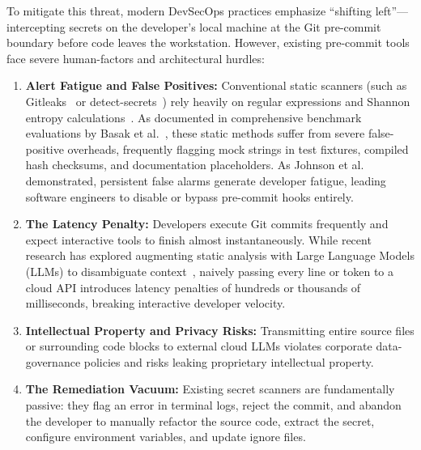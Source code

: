 To mitigate this threat, modern DevSecOps practices emphasize ``shifting left''---intercepting secrets on the developer's local machine at the Git pre-commit boundary before code leaves the workstation. However, existing pre-commit tools face severe human-factors and architectural hurdles:
\begin{enumerate}
    \item \textbf{Alert Fatigue and False Positives:} Conventional static scanners (such as Gitleaks~\cite{rice2018gitleaks} or detect-secrets~\cite{yelp2019detectsecrets}) rely heavily on regular expressions and Shannon entropy calculations~\cite{shannon1948mathematical}. As documented in comprehensive benchmark evaluations by Basak et al.~\cite{basak2023comparative}, these static methods suffer from severe false-positive overheads, frequently flagging mock strings in test fixtures, compiled hash checksums, and documentation placeholders. As Johnson et al.~\cite{johnson2013why} demonstrated, persistent false alarms generate developer fatigue, leading software engineers to disable or bypass pre-commit hooks entirely.
    \item \textbf{The Latency Penalty:} Developers execute Git commits frequently and expect interactive tools to finish almost instantaneously. While recent research has explored augmenting static analysis with Large Language Models (LLMs) to disambiguate context~\cite{shahriyar2025secret}, naively passing every line or token to a cloud API introduces latency penalties of hundreds or thousands of milliseconds, breaking interactive developer velocity.
    \item \textbf{Intellectual Property and Privacy Risks:} Transmitting entire source files or surrounding code blocks to external cloud LLMs violates corporate data-governance policies and risks leaking proprietary intellectual property.
    \item \textbf{The Remediation Vacuum:} Existing secret scanners are fundamentally passive: they flag an error in terminal logs, reject the commit, and abandon the developer to manually refactor the source code, extract the secret, configure environment variables, and update ignore files.
\end{enumerate}

